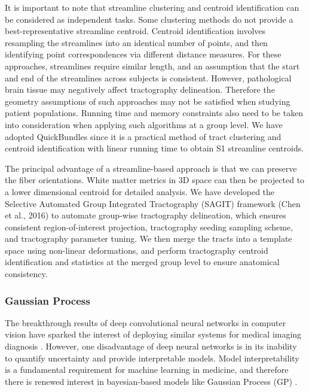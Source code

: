 It is important to note that streamline clustering and centroid identification can be considered as independent tasks. Some clustering methods do not provide a best-representative streamline centroid. Centroid identification involves resampling the streamlines into an identical number of points, and then identifying point correspondences via different distance measures. For these approaches, streamlines require similar length, and an assumption that the start and end of the streamlines across subjects is consistent. However, pathological brain tissue may negatively affect tractography delineation. Therefore the geometry assumptions of such approaches may not be satisfied when studying patient populations. Running time and memory constraints also need to be taken into consideration when applying such algorithms at a group level. We have adopted QuickBundles since it is a practical method of tract clustering and centroid identification with linear running time to obtain S1 streamline centroids. \cite{Garyfallidis2012}

The principal advantage of a streamline-based approach is that we can preserve the fiber orientations. White matter metrics in 3D space can then be projected to a lower dimensional centroid for detailed analysis. We have developed the Selective Automated Group Integrated Tractography (SAGIT) framework (Chen et al., 2016) to automate group-wise tractography delineation, which ensures consistent region-of-interest projection, tractography seeding sampling scheme, and tractography parameter tuning. We then merge the tracts into a template space using non-linear deformations, and  perform tractography centroid identification and statistics at the merged group level to ensure anatomical consistency. 

\subsubsection{Gaussian Process}
The breakthrough results of deep convolutional neural networks in computer vision \cite{Krizhevsky2012} have sparked the interest of deploying similar systems for medical imaging diagnosis \cite{Greenspan2016}. However, one disadvantage of deep neural networks is in its inability to quantify uncertainty and provide interpretable models. Model interpretability is a fundamental requirement for machine learning in medicine, and therefore there is renewed interest in bayesian-based models like Gaussian Process (GP) \cite{gal2016dropout}.

